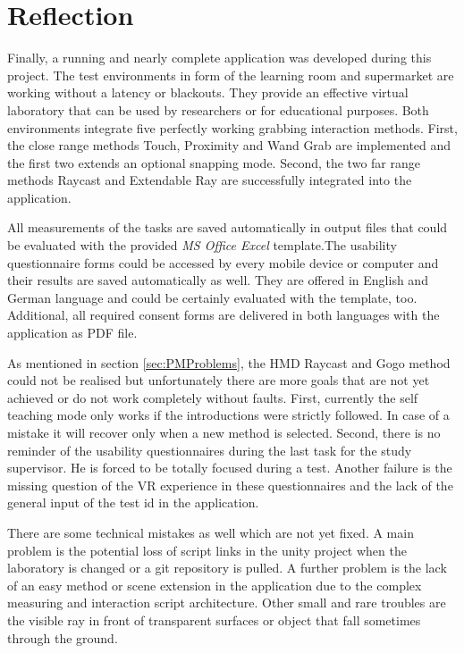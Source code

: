 \section{Reflection} \label{sec:Reflexion}


Finally, a running and nearly complete application was developed during this project. The test environments in form of the learning room and supermarket are working without a latency or blackouts. They provide an effective virtual laboratory that can be used by researchers or for educational purposes. Both environments integrate five perfectly working grabbing interaction methods. First, the close range methods Touch, Proximity and Wand Grab are implemented and the first two extends an optional snapping mode. Second, the two far range methods Raycast and Extendable Ray are successfully integrated into the application.
 
All measurements of the tasks are saved automatically in output files that could be evaluated with the provided \textit{MS Office Excel} template.The usability questionnaire forms could be accessed by every mobile device or computer and their results are saved automatically as well. They are offered in English and German language and could be certainly evaluated with the template, too. Additional, all required consent forms are delivered in both languages with the application as PDF file.

As mentioned in section \ref{sec:PMProblems}, the HMD Raycast and Gogo method could not be realised but unfortunately there are more goals that are not yet achieved or do not work completely without faults. First, currently the self teaching mode only works if the introductions were strictly followed. In case of a mistake it will recover only when a new method is selected. Second, there is no reminder of the usability questionnaires during the last task for the study supervisor. He is forced to be totally focused during a test. Another failure is the missing question of the VR experience in these questionnaires and the lack of the general input of the test id in the application.

There are some technical mistakes as well which are not yet fixed. A main problem is the potential loss of script links in the unity project when the laboratory is changed or a git repository is pulled. A further problem is the lack of an easy method or scene extension in the application due to the complex measuring and interaction script architecture. Other small and rare troubles are the visible ray in front of transparent surfaces or object that fall sometimes through the ground.

\newpage

























